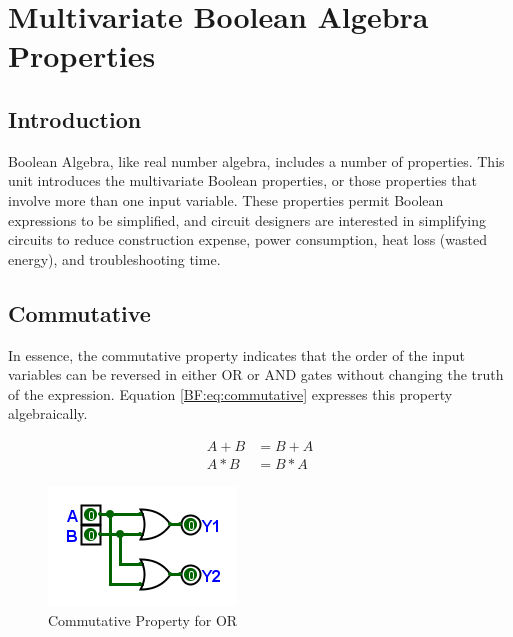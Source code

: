 \section{Multivariate Boolean Algebra Properties}
\label{BF:sec:multivariate_boolean_algebra_properties}
\subsection{Introduction}
\label{BF:subsec:introduction_to_multivariate}

Boolean Algebra, like real number algebra, includes a number of properties. This unit introduces the multivariate Boolean properties, or those properties that involve more than one input variable. These properties permit Boolean expressions to be simplified, and circuit designers are interested in simplifying circuits to reduce construction expense, power consumption, heat loss (wasted energy), and troubleshooting time.  

\subsection{Commutative}
\label{BF:subsec:commutative_property}


In essence, the commutative property indicates that the order of the input variables can be reversed in either \textsf{OR} or \textsf{AND} gates without changing the truth of the expression. Equation \ref{BF:eq:commutative} expresses this property algebraically.

\begin{align}
  \label{BF:eq:commutative}
  A + B &= B + A \\
  \nonumber
  A * B &= B * A
\end{align}

\begin{figure}[H]
	\centering
	\includegraphics[width=\maxwidth{.95\linewidth}]{gfx/04_19}
	\caption{Commutative Property for OR}
	\label{fig:04_19}
\end{figure}

